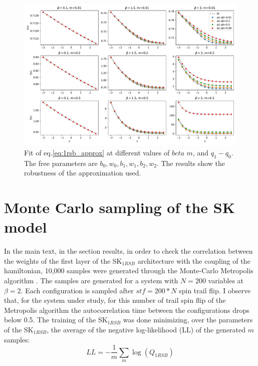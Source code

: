\documentclass[10pt, notitlepage]{revtex4-2}
\begin{document}
\begin{figure}[h]
    \centering
    \includegraphics[width=1\textwidth]{img/fit_1rsb.pdf}
    \caption{Fit of eq.\ref{eq:1rsb_approx} at different values of $beta$ $m$, and $q_1 - q_0$. The free parameters are $b_0, w_0, b_1, w_1, b_2, w_2$. The results show the robustness of the approximation used. }
    \label{fig:1rsb_approx}
\end{figure}


\section{Monte Carlo sampling of the SK model}
In the main text, in the section results, in order to check the correlation between the weights of the first layer of the SK$_{1RSB}$ architecture with the coupling of the hamiltonian, 10,000 samples were generated through the Monte-Carlo Metropolis algorithm \cite{doi:10.1063/1.1887186}. The samples are generated for a system with $N=200$ variables at $\beta=2$. Each configuration is sampled after $stf = 200*N$ spin trail flip.  I observe that, for the system under study, for this number of trail spin flip of the Metropolis algorithm the autocorrelation time between the configurations drops below 0.5. The training of the SK$_{1RSB}$ was done minimizing, over the parameters of the SK$_{1RSB}$, the average of the negative log-likelihood (LL) of the generated $m$ samples:
\begin{equation}
    LL = - \frac{1}{m} \sum_{m}\log(Q_{1RSB})
\end{equation}  
\end{document}
